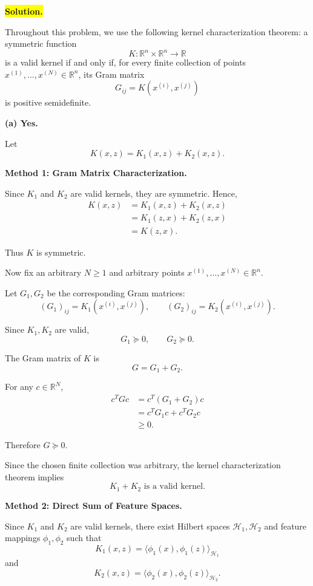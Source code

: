 \documentclass[11pt]{article}
\begin{document}
\medskip
\noindent\colorbox{yellow}{\textbf{Solution.}}
\vspace{3mm}

Throughout this problem, we use the following kernel
characterization theorem: a symmetric function
\[
K:\mathbb R^n\times\mathbb R^n\to\mathbb R
\]
is a valid kernel if and only if, for every finite
collection of points
$x^{(1)},\ldots,x^{(N)}\in\mathbb R^n$, its Gram matrix
\[
G_{ij}=K(x^{(i)},x^{(j)})
\]
is positive semidefinite.

\bigskip
\noindent\textbf{(a) Yes.}

Let
\[
K(x,z)=K_1(x,z)+K_2(x,z).
\]

\medskip
\noindent\textbf{Method 1: Gram Matrix Characterization.}

Since $K_1$ and $K_2$ are valid kernels, they are symmetric.
Hence,
\[
\begin{aligned}
K(x,z)
&=K_1(x,z)+K_2(x,z)\\
&=K_1(z,x)+K_2(z,x)\\
&=K(z,x).
\end{aligned}
\]

Thus $K$ is symmetric.

Now fix an arbitrary $N\geq1$ and arbitrary points
$x^{(1)},\ldots,x^{(N)}\in\mathbb R^n$.

Let $G_1,G_2$ be the corresponding Gram matrices:
\[
(G_1)_{ij}=K_1(x^{(i)},x^{(j)}),
\qquad
(G_2)_{ij}=K_2(x^{(i)},x^{(j)}).
\]

Since $K_1,K_2$ are valid,
\[
G_1\succeq0,
\qquad
G_2\succeq0.
\]

The Gram matrix of $K$ is
\[
G=G_1+G_2.
\]

For any $c\in\mathbb R^N$,
\[
\begin{aligned}
c^TGc
&=c^T(G_1+G_2)c\\
&=c^TG_1c+c^TG_2c\\
&\geq0.
\end{aligned}
\]

Therefore $G\succeq0$.

Since the chosen finite collection was arbitrary,
the kernel characterization theorem implies
\[
\boxed{K_1+K_2\text{ is a valid kernel.}}
\]

\medskip
\noindent\textbf{Method 2: Direct Sum of Feature Spaces.}

Since $K_1$ and $K_2$ are valid kernels, there exist
Hilbert spaces $\mathcal H_1,\mathcal H_2$ and
feature mappings $\phi_1,\phi_2$ such that
\[
K_1(x,z)
=\langle\phi_1(x),\phi_1(z)\rangle_{\mathcal H_1}
\]
and
\[
K_2(x,z)
=\langle\phi_2(x),\phi_2(z)\rangle_{\mathcal H_2}.
\]
\end{document}
